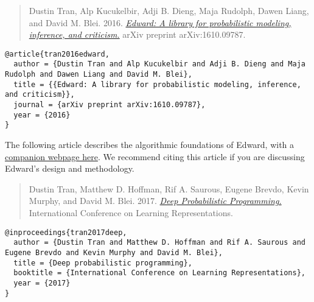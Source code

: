 \begin{quote}
Dustin Tran, Alp Kucukelbir, Adji B. Dieng, Maja Rudolph, Dawen Liang,
and David M. Blei.
2016.
\href{https://arxiv.org/abs/1610.09787}
{\emph{Edward: A library for probabilistic modeling, inference, and criticism.}}
arXiv preprint arXiv:1610.09787.
\end{quote}

\begin{lstlisting}[class=JSON]
@article{tran2016edward,
  author = {Dustin Tran and Alp Kucukelbir and Adji B. Dieng and Maja Rudolph and Dawen Liang and David M. Blei},
  title = {{Edward: A library for probabilistic modeling, inference, and criticism}},
  journal = {arXiv preprint arXiv:1610.09787},
  year = {2016}
}
\end{lstlisting}

The following article describes the algorithmic foundations of Edward,
with a \href{/iclr2017}{companion webpage here}.
We recommend citing this article if you are discussing Edward's
design and methodology.

\begin{quote}
Dustin Tran, Matthew D. Hoffman, Rif A. Saurous, Eugene Brevdo, Kevin
Murphy, and David M. Blei.
2017.
\href{https://arxiv.org/abs/1701.03757}{\emph{Deep Probabilistic Programming.}}
International Conference on Learning Representations.
\end{quote}

\begin{lstlisting}[class=JSON]
@inproceedings{tran2017deep,
  author = {Dustin Tran and Matthew D. Hoffman and Rif A. Saurous and Eugene Brevdo and Kevin Murphy and David M. Blei},
  title = {Deep probabilistic programming},
  booktitle = {International Conference on Learning Representations},
  year = {2017}
}
\end{lstlisting}
